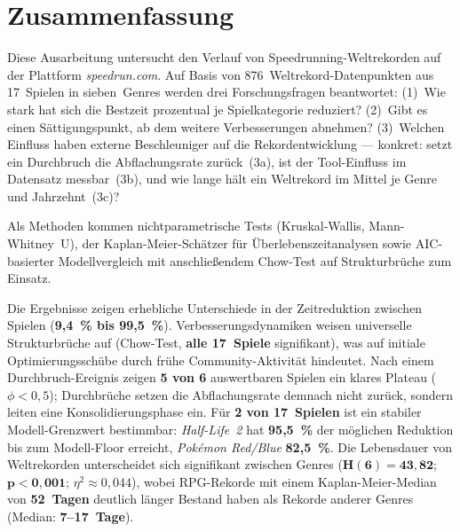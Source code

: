 \chapter*{Zusammenfassung}

Diese Ausarbeitung untersucht den Verlauf von Speedrunning-Weltrekorden auf der Plattform \textit{speedrun.com}. Auf Basis von 876~Weltrekord-Datenpunkten aus 17~Spielen in sieben~Genres werden drei Forschungsfragen beantwortet: (1)~Wie stark hat sich die Bestzeit prozentual je Spielkategorie reduziert? (2)~Gibt es einen Sättigungspunkt, ab dem weitere Verbesserungen abnehmen? (3)~Welchen Einfluss haben externe Beschleuniger auf die Rekordentwicklung --- konkret: setzt ein Durchbruch die Abflachungsrate zurück~(3a), ist der Tool-Einfluss im Datensatz messbar~(3b), und wie lange hält ein Weltrekord im Mittel je Genre und Jahrzehnt~(3c)?

Als Methoden kommen nichtparametrische Tests (Kruskal-Wallis, Mann-Whitney~U), der Kaplan-Meier-Schätzer für Überlebenszeitanalysen sowie AIC-basierter Modellvergleich mit anschließendem Chow-Test auf Strukturbrüche zum Einsatz.

Die Ergebnisse zeigen erhebliche Unterschiede in der Zeitreduktion zwischen Spielen (\textbf{9,4~\% bis 99,5~\%}). Verbesserungsdynamiken weisen universelle Strukturbrüche auf (Chow-Test, \textbf{alle 17~Spiele} signifikant), was auf initiale Optimierungsschübe durch frühe Community-Aktivität hindeutet. Nach einem Durchbruch-Ereignis zeigen \textbf{5 von 6} auswertbaren Spielen ein klares Plateau ($\phi < 0{,}5$); Durchbrüche setzen die Abflachungsrate demnach nicht zurück, sondern leiten eine Konsolidierungsphase ein. Für \textbf{2 von 17~Spielen} ist ein stabiler Modell-Grenzwert bestimmbar: \textit{Half-Life~2} hat \textbf{95,5~\%} der möglichen Reduktion bis zum Modell-Floor erreicht, \textit{Pokémon Red/Blue} \textbf{82,5~\%}. Die Lebensdauer von Weltrekorden unterscheidet sich signifikant zwischen Genres ($\mathbf{H(6) = 43{,}82}$; $\mathbf{p < 0{,}001}$; $\eta^2 \approx 0{,}044$), wobei RPG-Rekorde mit einem Kaplan-Meier-Median von \textbf{52~Tagen} deutlich länger Bestand haben als Rekorde anderer Genres (Median: \textbf{7–17~Tage}).

\clearpage

